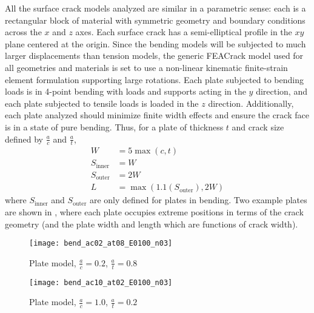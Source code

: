 All the surface crack models analyzed are similar in a parametric sense: each is a rectangular block of material with symmetric geometry and boundary conditions across the \(x\) and \(z\) axes.
Each surface crack has a semi-elliptical profile in the \(xy\) plane centered at the origin.
Since the bending models will be subjected to much larger displacements than tension models, the generic FEACrack model used for all geometries and materials is set to use a non-linear kinematic finite-strain element formulation supporting large rotations.
Each plate subjected to bending loads is in 4-point bending with loads and supports acting in the \(y\) direction, and each plate subjected to tensile loads is loaded in the \(z\) direction.
Additionally, each plate analyzed should minimize finite width effects and ensure the crack face is in a state of pure bending.
Thus, for a plate of thickness \(t\) and crack size defined by \(\frac{a}{c}\) and \(\frac{a}{t}\),
\begin{align*}
W &= 5 \max{(c, t)} \\
S_\text{inner} &= W \\
S_\text{outer} &= 2W \\
L &= \max{(1.1 (S_\text{outer}), 2W)}
\end{align*}
where \(S_\text{inner}\) and \(S_\text{outer}\) are only defined for plates in bending.
Two example plates are shown in , where each plate occupies extreme positions in terms of the crack geometry (and the plate width and length which are functions of crack width).
\begin{figure}[tbp]
\centering
\texttt{[image: bend\_ac02\_at08\_E0100\_n03]}
\caption{\label{fig:bend_ac02_at08_E0100_n03} Plate model, \(\frac{a}{c}=0.2\), \(\frac{a}{t}=0.8\)}
\end{figure}
\begin{figure}[tbp]
\centering
\texttt{[image: bend\_ac10\_at02\_E0100\_n03]}
\caption{\label{fig:bend_ac10_at02_E0100_n03} Plate model, \(\frac{a}{c}=1.0\), \(\frac{a}{t}=0.2\)}
\end{figure}


